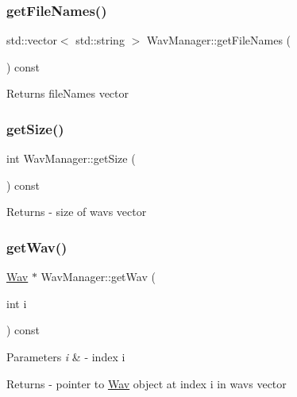 \subsubsection{\texorpdfstring{get\+File\+Names()}{getFileNames()}}
{\footnotesize\ttfamily std\+::vector$<$ std\+::string $>$ Wav\+Manager\+::get\+File\+Names (\begin{DoxyParamCaption}{ }\end{DoxyParamCaption}) const}

\begin{DoxyReturn}{Returns}
file\+Names vector 
\end{DoxyReturn}
\mbox{\label{classWavManager_a92aeb164533efeefd7d636b3da5b2828}} 
\subsubsection{\texorpdfstring{get\+Size()}{getSize()}}
{\footnotesize\ttfamily int Wav\+Manager\+::get\+Size (\begin{DoxyParamCaption}{ }\end{DoxyParamCaption}) const}

\begin{DoxyReturn}{Returns}
-\/ size of wavs vector 
\end{DoxyReturn}
\mbox{\label{classWavManager_a81286b348dd7d7969cfffebc0197e457}} 
\subsubsection{\texorpdfstring{get\+Wav()}{getWav()}}
{\footnotesize\ttfamily \hyperlink{classWav}{Wav} $\ast$ Wav\+Manager\+::get\+Wav (\begin{DoxyParamCaption}\item[{int}]{i }\end{DoxyParamCaption}) const}


\begin{DoxyParams}{Parameters}
{\em i} & -\/ index i \\
\hline
\end{DoxyParams}
\begin{DoxyReturn}{Returns}
-\/ pointer to \hyperlink{classWav}{Wav} object at index i in wavs vector 
\end{DoxyReturn}
\mbox{\label{classWavManager_af4ca861d89e3aceab92629958223784a}} 
